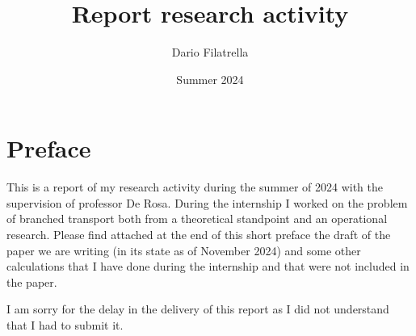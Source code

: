 \documentclass[11pt]{article}
\title{Report research activity}
\author{Dario Filatrella}
\date{Summer 2024}
\begin{document}
    \maketitle


    \section{Preface}
    This is a report of my research activity during the summer of 2024 with the supervision of professor De Rosa.
    During the internship I worked on the problem of branched transport both from a theoretical standpoint and
    an operational research.
    Please find attached at the end of this short preface the draft of the paper we are writing (in its state as of November 2024)
    and some other calculations that I have done during the internship and that were not included in the paper.

    I am sorry for the delay in the delivery of this report as I did not understand that I had to submit it.

    \newpage
\end{document}
